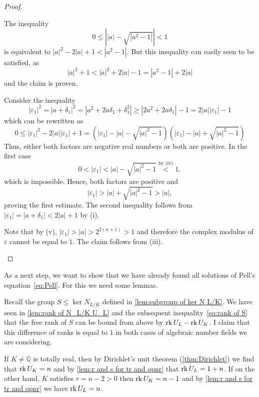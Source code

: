 \begin{proof}
\begin{plist}
    \item The inequality
    \[
      0 ≤ \left\vert |a| - \sqrt{|a^2 - 1|} \right\vert < 1
    \]
    is equivalent to \(|a|^2 - 2 |a| + 1 < |a^2 - 1|\). But this inequality can
    easily seen to be satisfied, as
    \[
      |a|^2 + 1 < |a|^2 + 2|a| - 1 = |a^2 - 1| + 2 |a|
    \]
    and the claim is proven.

    \item Consider the inequality
    \[
      |ε_1|^2 = |a + δ_1|^2 = |a^2 + 2 a δ_1 + δ_1^2| ≥ |2a^2 + 2a δ_1| - 1 =
                2 |a| |ε_1| - 1
    \]
    which can be rewritten as
    \[
      0 ≤ |ε_1|^2 - 2 |a| |ε_1| + 1 =
          \left(|ε_1| - |a| - \sqrt{|a|^2 - 1}\right)
          \left(|ε_1| - |a| + \sqrt{|a|^2 - 1}\right)
    \]
    Thus, either both factors are negative real numbers or both are positive. In
    the first case
    \[
      0 < |ε_1| < |a| - \sqrt{|a|^2 - 1} \overset{\text{by (iv)}}{<} 1,
    \]
    which is impossible. Hence, both factors are positive and
    \[
      |ε_1| > |a| + \sqrt{|a|^2 - 1}  > |a|,
    \]
    proving the first estimate. The second inequality follows from \(|ε_1| = |a
    + δ_1| < 2|a| + 1\) by (i).

    \item Note that by (v), \(|ε_1| > |a| > 2^{2(n + 1)} > 1\) and therefore the
    complex modulus of \(ε\) cannot be equal to \(1\). The claim follows from
    (iii).
  \end{plist}
\end{proof}

As a next step, we want to show that we have already found all solutions of
Pell's equation~\eqref{eq:Pell}. For this we need some lemmas.

Recall the group \(S ≤ \ker N_{L / K}\) defined in \cref{lem:subgroup of ker N
L/K}. We have seen in \cref{lem:rank of N_L/K U_L} and the subsequent
inequality~\eqref{eq:rank of S} that the free rank of \(S\) can be bound from
above by \(\operatorname{rk} U_L - \operatorname{rk} U_K\). I claim that this difference of ranks is equal
to \(1\) in both cases of algebraic number fields we are considering.

If \(K ≠ ℚ\) is totally real, then by Dirichlet's unit theorem
(\cref{thm:Dirichlet}) we find that \(\operatorname{rk} U_K = n\) and by \cref{lem:r and s for
tr and opnr} that \(\operatorname{rk} U_L = 1 + n\). If on the other hand, \(K\) satisfies
\(r = n - 2 > 0\) then \(\operatorname{rk} U_K = n - 1\) and by \cref{lem:r and s for tr and
opnr} we have \(\operatorname{rk} U_L = n\).

